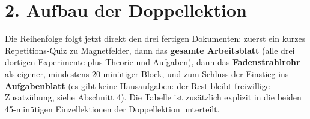 \documentclass[11pt,a4paper]{article}
\begin{document}
\section*{2. Aufbau der Doppellektion}

Die Reihenfolge folgt jetzt direkt den drei fertigen Dokumenten: zuerst
ein kurzes Repetitions-Quiz zu Magnetfelder, dann das \textbf{gesamte
Arbeitsblatt} (alle drei dortigen Experimente plus Theorie und Aufgaben),
dann das \textbf{Fadenstrahlrohr} als eigener, mindestens 20-minütiger
Block, und zum Schluss der Einstieg ins \textbf{Aufgabenblatt} (es gibt
keine Hausaufgaben: der Rest bleibt freiwillige Zusatzübung, siehe
Abschnitt 4). Die Tabelle ist zusätzlich explizit in die beiden
45-minütigen Einzellektionen der Doppellektion unterteilt.
\end{document}
